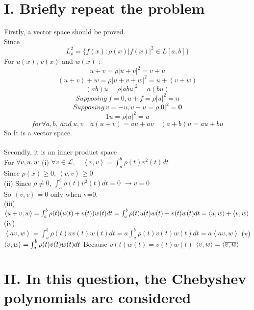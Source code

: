\documentclass[twoside,a4paper]{article}
\begin{document}
\pagestyle{fancy}
\fancyhead{}

\section*{I. Briefly repeat the problem}
Firstly, a vector space should be proved.\\
Since $$ L^{2} _\rho =\{ f(x): \rho (x) |f(x)|^2 \in L [a,b]\}$$
For $u(x)$, $v(x)$ and $w(x)$ :\\

$$u+v=\rho |u+v|^2=v+u$$
$$(u+v)+w=\rho |u+v+w|^2=u+(v+w)$$
$$(ab)u=\rho |abu|^2=a(bu)$$
$$Supposing \ f=0, u+f=\rho |u|^2=u$$
$$Supposing \ v=-u, v+u= \rho |0|^2=\textbf{0}$$
$$ 1u=\rho |u|^2=u$$
$$ for \forall a,b, \ and \ u,v  \quad a(u+v)=au+av \quad (a+b)u=au+bu$$
So It is a vector space.\\
\\
Secondly, it is an inner product space\\
For $\forall v,u,w\\$
(i) $\forall v\in \mathcal{L},\quad  \left< v,v \right>=  \int_{a}^b \rho (t) v^{2}(t) dt $\\
Since $\rho(x) \ge 0$, $ \left< v,v \right> \ge 0$\\
(ii) Since $\rho \neq 0$, $\int_{a}^{b} \rho (t) v^2(t) dt=0$ $\rightarrow v =0$\\
So $\left< v,v \right>=0$ only when v=0.\\
(iii)$\left< u+v,w \right>= \int_{a}^b \rho (t) (u(t)+v(t))w(t) dt=\int_{a}^b \rho (t) u(t)w(t)+v(t)w(t) dt=\left< u,w \right>+\left< v,w \right>\\$
(iv) $\left< av,w \right>= \int_{a}^b \rho (t) av(t)w(t) dt=a \int_{a}^b \rho (t) v(t)w(t) dt=a\left< av,w \right>$
(v) $\left< v,w \right>=\int_{a}^b \rho (t) v(t)w(t) dt\\$
Because $v(t)w(t)=\overline {v(t)w(t)}$
$\left< v,w \right>=\left< \overline {v,w} \right>\\$



\section*{II. In this question, the Chebyshev polynomials are considered}
\end{document}
